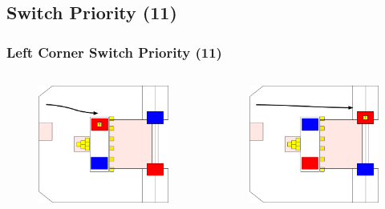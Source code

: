 \documentclass{beamer}
\begin{document}
\subsection{Switch Priority (11)}

\begin{frame}
 \frametitle{Left Corner Switch Priority \alert{(11)}}
 \begin{columns}
  \begin{figure}
   \includegraphics[scale=0.15]{assets/paths/11_LR}
  \end{figure}
  \begin{figure}
   \includegraphics[scale=0.15]{assets/paths/11_RL}

\end{figure}
\end{columns}
\end{frame}
\end{document}
